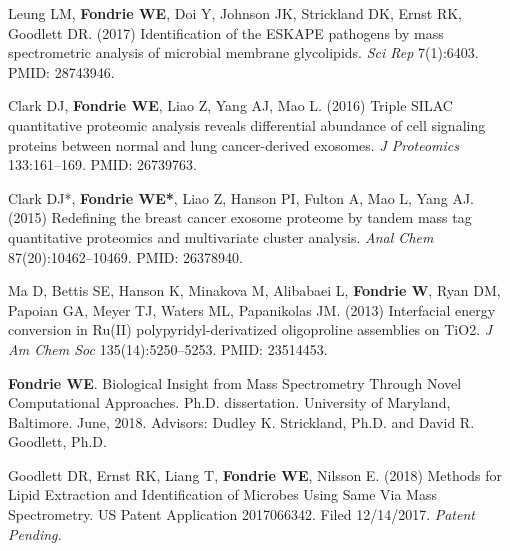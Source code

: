 \documentclass{article}
\newcommand{\mysection}[1]{\vspace{1ex {\bf \large \textrm{#1}} \quad \hrulefill}}
\begin{document}
\begin{etaremune}
  \item Leung LM, {\bf Fondrie WE}, Doi Y, Johnson JK, Strickland DK, Ernst RK,
    Goodlett DR. (2017) Identification of the ESKAPE pathogens by mass
    spectrometric analysis of microbial membrane glycolipids. {\it Sci Rep}
    7(1):6403. PMID: 28743946. 

  \item Clark DJ, {\bf Fondrie WE}, Liao Z, Yang AJ, Mao L. (2016) Triple SILAC
    quantitative proteomic analysis reveals differential abundance of cell
    signaling proteins between normal and lung cancer-derived exosomes. {\it J
      Proteomics} 133:161--169. PMID: 26739763.

  \item Clark DJ*, {\bf Fondrie WE*}, Liao Z, Hanson PI, Fulton A, Mao L, Yang
    AJ. (2015) Redefining the breast cancer exosome proteome by tandem mass tag
    quantitative proteomics and multivariate cluster analysis. \textit{Anal
      Chem} 87(20):10462--10469. PMID: 26378940. 
    
  \item Ma D, Bettis SE, Hanson K, Minakova M, Alibabaei L, {\bf Fondrie W},
    Ryan DM, Papoian GA, Meyer TJ, Waters ML, Papanikolas JM. (2013) Interfacial
    energy conversion in Ru(II) polypyridyl-derivatized oligoproline assemblies
    on TiO2. \textit{J Am Chem Soc} 135(14):5250--5253. PMID: 23514453. 
\end{etaremune}

\mysection{Additional Publications}
\begin{etaremune}
  \item {\bf Fondrie WE}. Biological Insight from Mass Spectrometry Through
    Novel Computational Approaches. Ph.D. dissertation. University of Maryland,
    Baltimore. June, 2018. Advisors: Dudley K. Strickland, Ph.D. and David R.
    Goodlett, Ph.D.
\end{etaremune}

\mysection{Patents}
\begin{etaremune}
  \item Goodlett DR, Ernst RK, Liang T, {\bf Fondrie WE}, Nilsson E. (2018)
    Methods for Lipid Extraction and Identification of Microbes Using Same Via
    Mass Spectrometry. US Patent Application 2017066342. Filed 12/14/2017. {\it
      Patent Pending.}
\end{etaremune}
\end{document}
